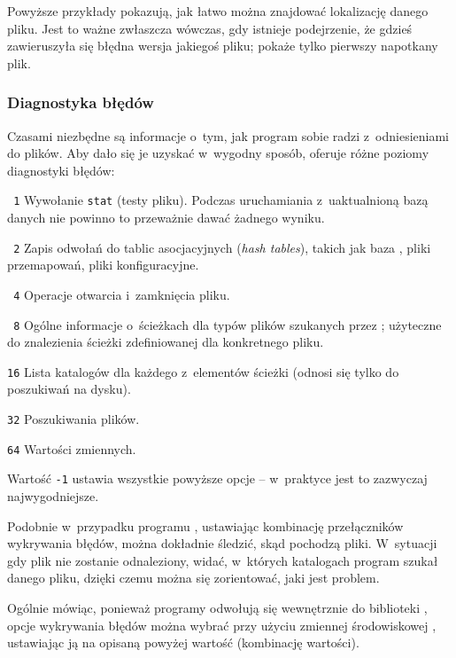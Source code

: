 \documentclass{article}
\begin{document}
Powyższe przykłady pokazują, jak łatwo można znajdować lokalizację danego
pliku. Jest to ważne zwłaszcza wówczas, gdy istnieje podejrzenie, że gdzieś
zawieruszyła się  błędna wersja jakiegoś pliku;  pokaże tylko
pierwszy napotkany plik.

\subsubsection{Diagnostyka błędów}
\label{sec:debugging}

Czasami niezbędne są informacje o~tym, jak program sobie radzi
z~odniesieniami do plików.  Aby dało się  je uzyskać w~wygodny sposób,
\KPS{} oferuje różne poziomy diagnostyki błędów:
\begin{ttdescription}
\item[\texttt{\ 1}] Wywołanie \texttt{stat} (testy pliku). Podczas
  uruchamiania z~uaktualnioną bazą danych  nie powinno to
  przeważnie dawać żadnego wyniku.
\item[\texttt{\ 2}] Zapis odwołań do tablic asocjacyjnych (\emph{hash
 tables}), takich jak baza , pliki przemapowań, pliki konfiguracyjne.
\item[\texttt{\ 4}] Operacje otwarcia i~zamknięcia pliku.
\item[\texttt{\ 8}] Ogólne informacje o~ścieżkach dla typów
  plików szukanych przez \KPS; użyteczne do znalezienia ścieżki
  zdefiniowanej dla konkretnego pliku.
\item[\texttt{16}] Lista katalogów dla każdego z~elementów ścieżki
  (odnosi się  tylko do poszukiwań na dysku).
\item[\texttt{32}] Poszukiwania plików.
\item[\texttt{64}] Wartości zmiennych.
\end{ttdescription}
Wartość \texttt{-1} ustawia wszystkie powyższe opcje -- w~praktyce jest to zazwyczaj najwygodniejsze.

Podobnie w~przypadku programu , ustawiając kombinację
przełączników wykrywania błędów, można dokładnie śledzić, skąd pochodzą pliki.
W~sytuacji gdy plik nie zostanie odnaleziony, widać, w~których katalogach
program szukał danego pliku, dzięki czemu można się  zorientować, jaki jest problem.

Ogólnie mówiąc, ponieważ programy odwołują się  wewnętrznie do
biblioteki \KPS{}, opcje wykrywania błędów można wybrać przy użyciu
zmiennej środowiskowej , ustawiając ją
na opisaną powyżej wartość (kombinację wartości).
\end{document}

